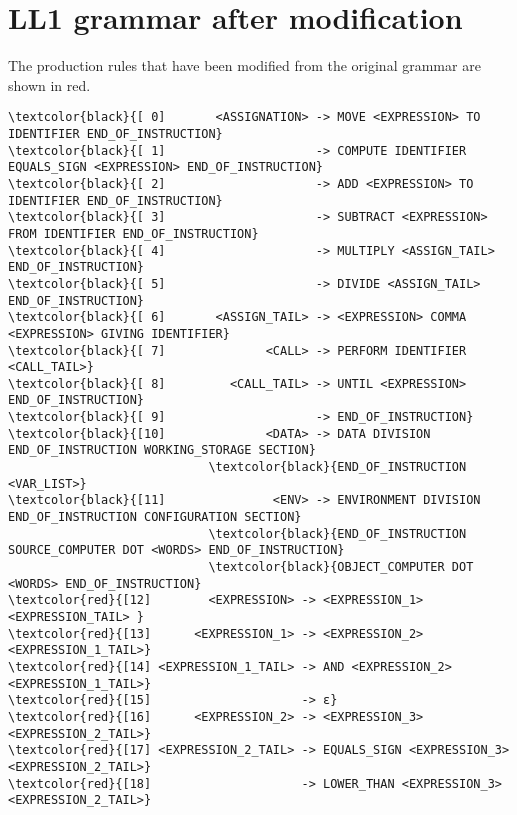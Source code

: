 \newpage\cleardoublepage{}
\section{LL1 grammar after modification}
\label{app:grammar}

The production rules that have been modified from the original grammar are shown in red.

\vspace{5mm}
\begingroup
\fontsize{8pt}{10pt}\selectfont
\begin{Verbatim}[commandchars=\\\{\}]
\textcolor{black}{[ 0]       <ASSIGNATION> -> MOVE <EXPRESSION> TO IDENTIFIER END_OF_INSTRUCTION}
\textcolor{black}{[ 1]                     -> COMPUTE IDENTIFIER EQUALS_SIGN <EXPRESSION> END_OF_INSTRUCTION}
\textcolor{black}{[ 2]                     -> ADD <EXPRESSION> TO IDENTIFIER END_OF_INSTRUCTION}
\textcolor{black}{[ 3]                     -> SUBTRACT <EXPRESSION> FROM IDENTIFIER END_OF_INSTRUCTION}
\textcolor{black}{[ 4]                     -> MULTIPLY <ASSIGN_TAIL> END_OF_INSTRUCTION}
\textcolor{black}{[ 5]                     -> DIVIDE <ASSIGN_TAIL> END_OF_INSTRUCTION}
\textcolor{black}{[ 6]       <ASSIGN_TAIL> -> <EXPRESSION> COMMA <EXPRESSION> GIVING IDENTIFIER}
\textcolor{black}{[ 7]              <CALL> -> PERFORM IDENTIFIER <CALL_TAIL>}
\textcolor{black}{[ 8]         <CALL_TAIL> -> UNTIL <EXPRESSION> END_OF_INSTRUCTION}
\textcolor{black}{[ 9]                     -> END_OF_INSTRUCTION}
\textcolor{black}{[10]              <DATA> -> DATA DIVISION END_OF_INSTRUCTION WORKING_STORAGE SECTION}
                            \textcolor{black}{END_OF_INSTRUCTION <VAR_LIST>}
\textcolor{black}{[11]               <ENV> -> ENVIRONMENT DIVISION END_OF_INSTRUCTION CONFIGURATION SECTION}
                            \textcolor{black}{END_OF_INSTRUCTION SOURCE_COMPUTER DOT <WORDS> END_OF_INSTRUCTION}
                            \textcolor{black}{OBJECT_COMPUTER DOT <WORDS> END_OF_INSTRUCTION}
\textcolor{red}{[12]        <EXPRESSION> -> <EXPRESSION_1> <EXPRESSION_TAIL> }
\textcolor{red}{[13]      <EXPRESSION_1> -> <EXPRESSION_2> <EXPRESSION_1_TAIL>}
\textcolor{red}{[14] <EXPRESSION_1_TAIL> -> AND <EXPRESSION_2> <EXPRESSION_1_TAIL>}
\textcolor{red}{[15]                     -> ε}
\textcolor{red}{[16]      <EXPRESSION_2> -> <EXPRESSION_3> <EXPRESSION_2_TAIL>}
\textcolor{red}{[17] <EXPRESSION_2_TAIL> -> EQUALS_SIGN <EXPRESSION_3> <EXPRESSION_2_TAIL>}
\textcolor{red}{[18]                     -> LOWER_THAN <EXPRESSION_3> <EXPRESSION_2_TAIL>}

\end{Verbatim}
